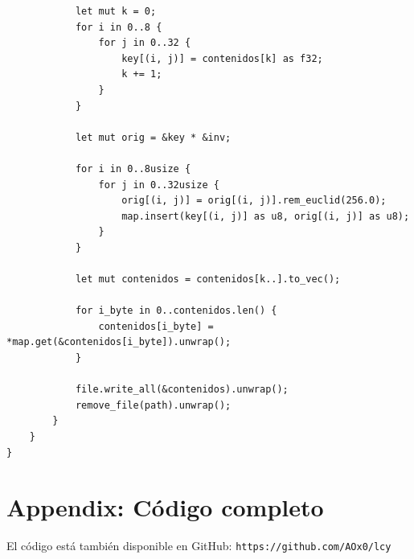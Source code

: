 \documentclass[a4paper]{article}
\begin{document}
\begin{verbatim}
            let mut k = 0;
            for i in 0..8 {
                for j in 0..32 {
                    key[(i, j)] = contenidos[k] as f32;
                    k += 1;
                }
            }

            let mut orig = &key * &inv;

            for i in 0..8usize {
                for j in 0..32usize {
                    orig[(i, j)] = orig[(i, j)].rem_euclid(256.0);
                    map.insert(key[(i, j)] as u8, orig[(i, j)] as u8);
                }
            }

            let mut contenidos = contenidos[k..].to_vec();

            for i_byte in 0..contenidos.len() {
                contenidos[i_byte] = *map.get(&contenidos[i_byte]).unwrap();
            }

            file.write_all(&contenidos).unwrap();
            remove_file(path).unwrap();
        }
    }
}
\end{verbatim}

\newpage
\section{Appendix: Código completo}

El código está también disponible en GitHub:
\texttt{https://github.com/AOx0/lcy}
\end{document}

